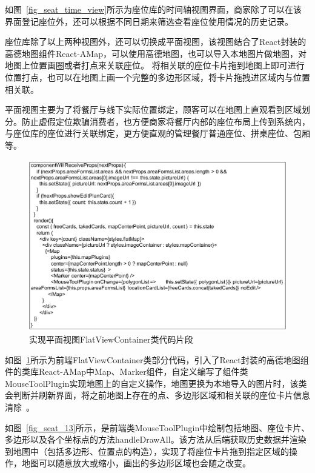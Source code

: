 如图~\ref{fig_seat_time_view}所示为座位库的时间轴视图界面，商家除了可以在该界面登记座位外，还可以根据不同日期来筛选查看座位使用情况的历史记录。

座位库除了以上两种视图外，还可以切换成平面视图，该视图结合了React封装的高德地图组件React-AMap，可以使用高德地图，也可以导入本地图片做地图，对地图上位置画圈或者打点来关联座位。
将相关联的座位卡片拖到地图上即可进行位置打点，也可以在地图上画一个完整的多边形区域，将卡片拖拽进区域内与位置相关联。

平面视图主要为了将餐厅与线下实际位置绑定，顾客可以在地图上直观看到区域划分。防止虚假定位欺骗消费者，也方便商家将餐厅内部的座位布局上传到系统内，与座位库的座位进行关联绑定，更方便直观的管理餐厅普通座位、拼桌座位、包厢等。

\begin{figure}[htbp!]
    \centering
    \includegraphics[width=5in]{FIGs/chapter4/12.pdf}
    \caption{实现平面视图FlatViewContainer类代码片段}\label{fig_seat_12}
\end{figure}

如图~\ref{fig_seat_12}所示为前端FlatViewContainer类部分代码，引入了React封装的高德地图组件的类库React-AMap中Map、Marker组件，自定义编写了组件类MouseToolPlugin实现地图上的自定义操作，地图更换为本地导入的图片时，该类会判断并刷新界面，将之前地图上存在的点、多边形区域和相关联的座位卡片信息清除~\cite{lzt2015}。

如图~\ref{fig_seat_13}所示，是前端类MouseToolPlugin中绘制包括地图、座位卡片、多边形以及各个坐标点的方法handleDrawAll。该方法从后端获取历史数据并渲染到地图中（包括多边形、位置点的构造），实现了将座位卡片拖到指定区域的操作，地图可以随意放大或缩小，画出的多边形区域也会随之改变。

